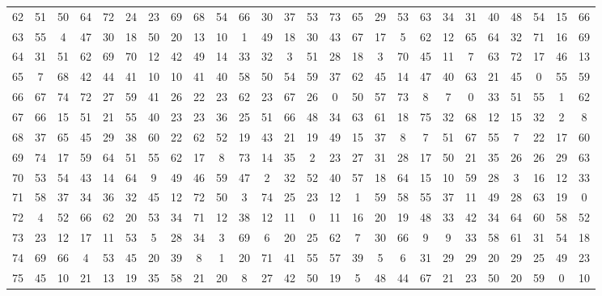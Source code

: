 \begin{table}
\begin{tabular}{c c c c c c c c c c c c c c c c c c c c c c c c c c }
62 & 51 & 50 & 64 & 72 & 24 & 23 & 69 & 68 & 54 & 66 & 30 & 37 & 53 & 73 & 65 & 29 & 53 & 63 & 34 & 31 & 40 & 48 & 54 & 15 & 66 \\
63 & 55 & 4 & 47 & 30 & 18 & 50 & 20 & 13 & 10 & 1 & 49 & 18 & 30 & 43 & 67 & 17 & 5 & 62 & 12 & 65 & 64 & 32 & 71 & 16 & 69 \\
64 & 31 & 51 & 62 & 69 & 70 & 12 & 42 & 49 & 14 & 33 & 32 & 3 & 51 & 28 & 18 & 3 & 70 & 45 & 11 & 7 & 63 & 72 & 17 & 46 & 13 \\
65 & 7 & 68 & 42 & 44 & 41 & 10 & 10 & 41 & 40 & 58 & 50 & 54 & 59 & 37 & 62 & 45 & 14 & 47 & 40 & 63 & 21 & 45 & 0 & 55 & 59 \\
66 & 67 & 74 & 72 & 27 & 59 & 41 & 26 & 22 & 23 & 62 & 23 & 67 & 26 & 0 & 50 & 57 & 73 & 8 & 7 & 0 & 33 & 51 & 55 & 1 & 62 \\
67 & 66 & 15 & 51 & 21 & 55 & 40 & 23 & 23 & 36 & 25 & 51 & 66 & 48 & 34 & 63 & 61 & 18 & 75 & 32 & 68 & 12 & 15 & 32 & 2 & 8 \\
68 & 37 & 65 & 45 & 29 & 38 & 60 & 22 & 62 & 52 & 19 & 43 & 21 & 19 & 49 & 15 & 37 & 8 & 7 & 51 & 67 & 55 & 7 & 22 & 17 & 60 \\
69 & 74 & 17 & 59 & 64 & 51 & 55 & 62 & 17 & 8 & 73 & 14 & 35 & 2 & 23 & 27 & 31 & 28 & 17 & 50 & 21 & 35 & 26 & 26 & 29 & 63 \\
70 & 53 & 54 & 43 & 14 & 64 & 9 & 49 & 46 & 59 & 47 & 2 & 32 & 52 & 40 & 57 & 18 & 64 & 15 & 10 & 59 & 28 & 3 & 16 & 12 & 33 \\
71 & 58 & 37 & 34 & 36 & 32 & 45 & 12 & 72 & 50 & 3 & 74 & 25 & 23 & 12 & 1 & 59 & 58 & 55 & 37 & 11 & 49 & 28 & 63 & 19 & 0 \\
72 & 4 & 52 & 66 & 62 & 20 & 53 & 34 & 71 & 12 & 38 & 12 & 11 & 0 & 11 & 16 & 20 & 19 & 48 & 33 & 42 & 34 & 64 & 60 & 58 & 52 \\
73 & 23 & 12 & 17 & 11 & 53 & 5 & 28 & 34 & 3 & 69 & 6 & 20 & 25 & 62 & 7 & 30 & 66 & 9 & 9 & 33 & 58 & 61 & 31 & 54 & 18 \\
74 & 69 & 66 & 4 & 53 & 45 & 20 & 39 & 8 & 1 & 20 & 71 & 41 & 55 & 57 & 39 & 5 & 6 & 31 & 29 & 29 & 20 & 29 & 25 & 49 & 23 \\
75 & 45 & 10 & 21 & 13 & 19 & 35 & 58 & 21 & 20 & 8 & 27 & 42 & 50 & 19 & 5 & 48 & 44 & 67 & 21 & 23 & 50 & 20 & 59 & 0 & 10 \\
\hline
\end{tabular}
\end{table}